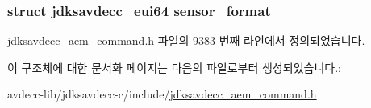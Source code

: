 \subsubsection[{\texorpdfstring{sensor\+\_\+format}{sensor_format}}]{\setlength{\rightskip}{0pt plus 5cm}struct {\bf jdksavdecc\+\_\+eui64} sensor\+\_\+format}\hypertarget{structjdksavdecc__aem__command__set__sensor__format__response_a100aa7be90c95e113ca53584ab78094a}{}\label{structjdksavdecc__aem__command__set__sensor__format__response_a100aa7be90c95e113ca53584ab78094a}


jdksavdecc\+\_\+aem\+\_\+command.\+h 파일의 9383 번째 라인에서 정의되었습니다.



이 구조체에 대한 문서화 페이지는 다음의 파일로부터 생성되었습니다.\+:\begin{DoxyCompactItemize}
\item 
avdecc-\/lib/jdksavdecc-\/c/include/\hyperlink{jdksavdecc__aem__command_8h}{jdksavdecc\+\_\+aem\+\_\+command.\+h}\end{DoxyCompactItemize}
